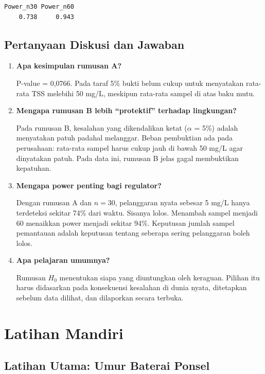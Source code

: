\documentclass[
  indonesian,
  letterpaper,
]{book}
\begin{document}
\begin{verbatim}
Power_n30 Power_n60 
    0.738     0.943 
\end{verbatim}

\subsection{Pertanyaan Diskusi dan
Jawaban}\label{pertanyaan-diskusi-dan-jawaban-1}

\begin{enumerate}
\def\labelenumi{\arabic{enumi}.}
\item
  \textbf{Apa kesimpulan rumusan A?}

  P-value = 0,0766. Pada taraf 5\% bukti belum cukup untuk menyatakan
  rata-rata TSS melebihi 50 mg/L, meskipun rata-rata sampel di atas baku
  mutu.
\item
  \textbf{Mengapa rumusan B lebih ``protektif'' terhadap lingkungan?}

  Pada rumusan B, kesalahan yang dikendalikan ketat (\(\alpha\) = 5\%)
  adalah menyatakan patuh padahal melanggar. Beban pembuktian ada pada
  perusahaan: rata-rata sampel harus cukup jauh di bawah 50 mg/L agar
  dinyatakan patuh. Pada data ini, rumusan B jelas gagal membuktikan
  kepatuhan.
\item
  \textbf{Mengapa power penting bagi regulator?}

  Dengan rumusan A dan \(n = 30\), pelanggaran nyata sebesar 5 mg/L
  hanya terdeteksi sekitar 74\% dari waktu. Sisanya lolos. Menambah
  sampel menjadi 60 menaikkan power menjadi sekitar 94\%. Keputusan
  jumlah sampel pemantauan adalah keputusan tentang seberapa sering
  pelanggaran boleh lolos.
\item
  \textbf{Apa pelajaran umumnya?}

  Rumusan \(H_0\) menentukan siapa yang diuntungkan oleh keraguan.
  Pilihan itu harus didasarkan pada konsekuensi kesalahan di dunia
  nyata, ditetapkan sebelum data dilihat, dan dilaporkan secara terbuka.
\end{enumerate}

\section{Latihan Mandiri}\label{latihan-mandiri-1}

\subsection{Latihan Utama: Umur Baterai
Ponsel}\label{latihan-utama-umur-baterai-ponsel}
\end{document}
